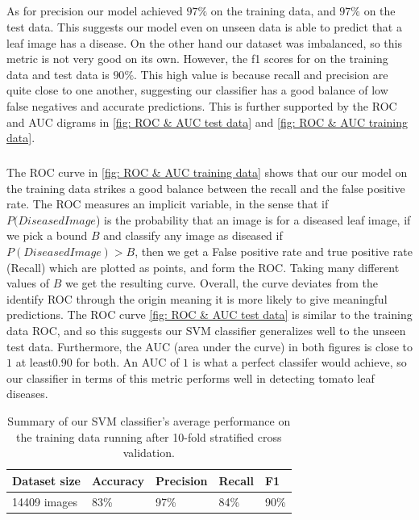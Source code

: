 \subparagraph{}
As for precision our model achieved $97\%$ on the training data, and $97\%$ on the
test data. This suggests our model even on unseen data is able to predict that a
leaf image has a disease. On the other hand our dataset was imbalanced, so this
metric is not very good on its own. However, the f1 scores for on the training
data and test data is $90\%$. This high value is because recall and precision are
quite close to one another, suggesting our classifier has a good balance of low
false negatives and accurate predictions. This is further supported by the ROC
and AUC digrams in \ref{fig: ROC & AUC test data} and \ref{fig: ROC & AUC training data}.

\subparagraph{}
The ROC curve in \ref{fig: ROC & AUC training data} shows that our our model on the training data strikes a
good balance between the recall and the false positive rate. The ROC measures
an implicit variable, in the sense that if $P(DiseasedImage$) is the probability
that an image is for a diseased leaf image, if we pick a bound $B$ and classify any
image as diseased if $P(DiseasedImage) > B$, then we get a False positive rate
and true positive rate (Recall) which are plotted as points, and form the ROC.
Taking many different values of $B$ we get the resulting curve. Overall, the curve
deviates from the identify ROC through the origin meaning it is more likely to
give meaningful predictions. The ROC curve \ref{fig: ROC & AUC test data} is similar to the training data
ROC, and so this suggests our SVM classifier generalizes well to the unseen test
data. Furthermore, the AUC (area under the curve) in both figures is close to
$1$ at least$0.90$ for both. An AUC of $1$ is what a perfect classifer would achieve,
so our classifier in terms of this metric performs well in detecting tomato leaf
diseases.

\begin{table}[htbp]
	\centering
	\begin{tabular}{|l|l|l|l|l|}
		\hline
		\textbf{Dataset size} & \textbf{Accuracy} & \textbf{Precision} & \textbf{Recall} & \textbf{F1} \\ \hline
		14409 images          & 83\%             & 97\%              & 84\%           & 90\%        \\ \hline
	\end{tabular}
	\caption{Summary of our SVM classifier’s average performance on the training data running after 10-fold stratified cross validation.}
	\label{table:svm_performance}
\end{table}

